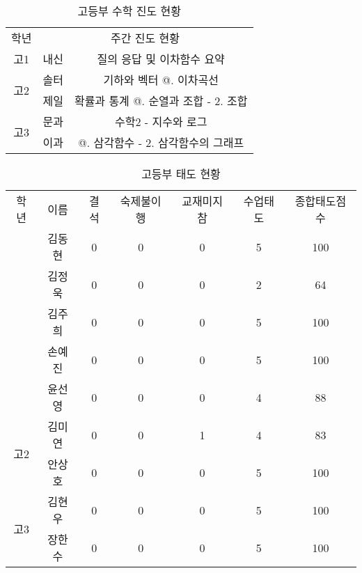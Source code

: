 \documentclass[idxtotoc,hyperref,openany]{labbook} %
\makeatletter
\newcommand*{\rom}[1]{\expandafter\@slowromancap\romannumeral #1@}
\makeatother
\begin{document}


\begin{table}[h]
\centering
\begin{adjustbox}{width=.75\textwidth}
\begin{tabular}{c||c|c}
\toprule
\midrule
학년 & \multicolumn{2}{c}{주간 진도 현황} \\
\hhline{=||==}
고1 & 내신 & 질의 응답 및 이차함수 요약  \\
\hline
\multirow{2}{*}{고2} & 솔터 & 기하와 벡터 \rom{1}. 이차곡선 \\ \hhline{~--}
					& 제일 & 확률과 통계 \rom{1}. 순열과 조합 - 2. 조합 \\
\hline
\multirow{2}{*}{고3} & 문과 & 수학2 - 지수와 로그 \\ \hhline{~--}
					& 이과 & \rom{2}. 삼각함수 - 2. 삼각함수의 그래프  \\

\hline
\end{tabular}
\end{adjustbox}
\caption{\label{tab:ii} 고등부 수학 진도 현황 }
\end{table}





\begin{table}[H]
\centering
\begin{adjustbox}{width=\textwidth}
\begin{tabular}{c|c||c|c|c|c|c}
\toprule
\midrule
학년 & 이름 & 결석 & 숙제불이행 & 교재미지참 & 수업태도 & 종합태도점수 \\
\hhline{=|=||=|=|=|=|=}
\multirow{5}{*}{고1}& 김동현 & 0 & 0 & 0 & 5 & 100  \\ \hhline{~------}
					& 김정욱 & 0 & 0 & 0 & 2 & 64   \\ \hhline{~------}
					& 김주희 & 0 & 0 & 0 & 5 & 100   \\ \hhline{~------}
					& 손예진 & 0 & 0 & 0 & 5 & 100  \\ \hhline{~------}
					& 윤선영 & 0 & 0 & 0 & 4 & 88   \\
\hline
\multirow{2}{*}{고2}& 김미연 & 0 & 0 & 1 & 4 & 83   \\ \hhline{~------}
					& 안상호 & 0 & 0 & 0 & 5 & 100	\\ 
\hline
\multirow{2}{*}{고3}& 김현우 & 0 & 0 & 0 & 5 & 100 \\ \hhline{~------}
					& 장한수 & 0 & 0 & 0 & 5 & 100	\\
\hline
\end{tabular}
\end{adjustbox}
\caption{\label{tab:iii} 고등부 태도 현황 }
\end{table}
\end{document}
